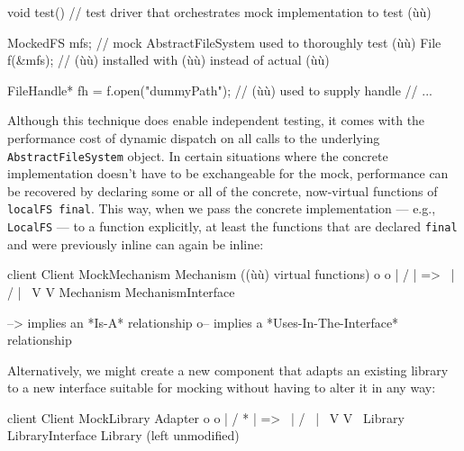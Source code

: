{{\begin{emcppslisting}
void test()  // test driver that orchestrates mock implementation to test (ù{}ù)
{
    MockedFS mfs;  // mock AbstractFileSystem used to thoroughly test (ù{}ù)
    File f(&mfs);  // (ù{}ù) installed with (ù{}ù) instead of actual (ù{}ù)

    FileHandle* fh = f.open("dummyPath");  // (ù{}ù) used to supply handle
    // ...
}
\end{emcppslisting}
    

\noindent Although this technique does enable independent testing, it comes with
the performance cost of dynamic dispatch on all calls to the underlying
\lstinline!AbstractFileSystem! object. In certain situations where the
concrete implementation doesn't have to be exchangeable for the mock,
performance can be recovered by declaring some or all of the concrete,
now-virtual functions of \lstinline!localFS!~\lstinline!final!. This way, when
we pass the concrete implementation --- e.g., \lstinline!LocalFS! --- to a
function explicitly, at least the functions that are declared
\lstinline!final! and were previously inline can again be inline:

\begin{emcppslisting}
client          Client  MockMechanism   Mechanism   ((ù{}ù) virtual functions)
   o                 o        |          /
   |       =>         \       |         /
   |                   \      V        V
Mechanism             MechanismInterface

--> implies an *Is-A* relationship
o-- implies a *Uses-In-The-Interface* relationship
\end{emcppslisting}
    

\noindent Alternatively, we might create a new component that adapts an existing
library to a new interface suitable for mocking without having to alter
it in any way:

\begin{emcppslisting}
client          Client   MockLibrary      Adapter
   o                 o        |          /       *
   |       =>         \       |         /         \
   |                   \      V        V           \
Library                 LibraryInterface         Library   (left unmodified)


\end{emcppslisting}}}
